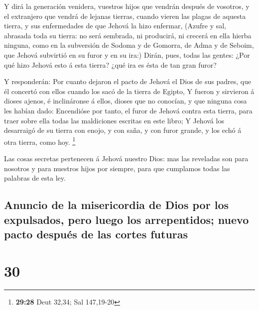  Y dirá la generación venidera, vuestros hijos que vendrán
después de vosotros, y el extranjero que vendrá de lejanas tierras,
cuando vieren las plagas de aquesta tierra, y sus enfermedades de que
Jehová la hizo enfermar,  (Azufre y sal, abrasada toda su
tierra: no será sembrada, ni producirá, ni crecerá en ella hierba
ninguna, como en la subversión de Sodoma y de Gomorra, de Adma y de
Seboim, que Jehová subvirtió en su furor y en su ira:) 
Dirán, pues, todas las gentes: ¿Por qué hizo Jehová esto á esta tierra?
¿qué ira es ésta de tan gran furor?

 Y responderán: Por cuanto dejaron el pacto de Jehová el
Dios de sus padres, que él concertó con ellos cuando los sacó de la
tierra de Egipto,  Y fueron y sirvieron á dioses ajenos, é
inclináronse á ellos, dioses que no conocían, y que ninguna cosa les
habían dado:  Encendióse por tanto, el furor de Jehová
contra esta tierra, para traer sobre ella todas las maldiciones escritas
en este libro;  Y Jehová los desarraigó de su tierra con
enojo, y con saña, y con furor grande, y los echó á otra tierra, como
hoy. \footnote{\textbf{29:28} Deut 32,34; Sal 147,19-20}

 Las cosas secretas pertenecen á Jehová nuestro Dios: mas
las reveladas son para nosotros y para nuestros hijos por siempre, para
que cumplamos todas las palabras de esta ley.

\hypertarget{anuncio-de-la-misericordia-de-dios-por-los-expulsados-pero-luego-los-arrepentidos-nuevo-pacto-despuuxe9s-de-las-cortes-futuras}{%
\subsection{Anuncio de la misericordia de Dios por los expulsados, pero
luego los arrepentidos; nuevo pacto después de las cortes
futuras}\label{anuncio-de-la-misericordia-de-dios-por-los-expulsados-pero-luego-los-arrepentidos-nuevo-pacto-despuuxe9s-de-las-cortes-futuras}}

\hypertarget{section-29}{%
\section{30}\label{section-29}}


